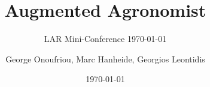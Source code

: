 \documentclass[aspectratio=169]{beamer}
\title{Augmented Agronomist}
\subtitle{LAR Mini-Conference \today}
\author{George Onoufriou, Marc Hanheide, Georgios Leontidis}
\date{\today}
\begin{document}

  \frame{\titlepage}

\end{document}
